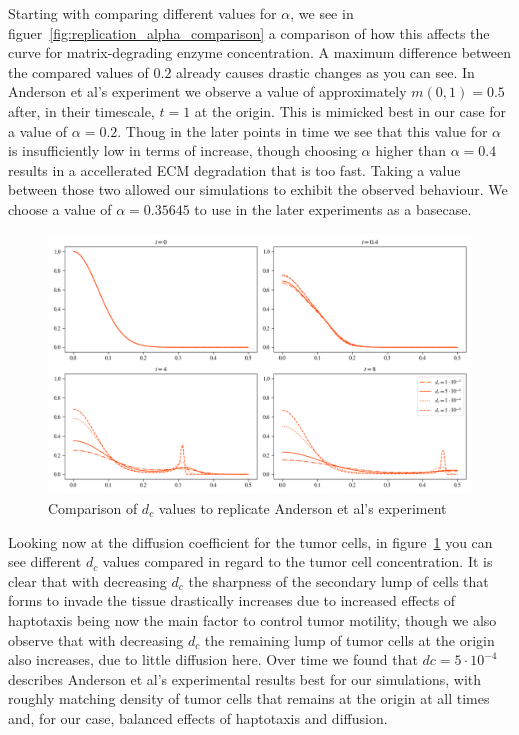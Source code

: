 Starting with comparing different values for $\alpha$, we see in figuer~\ref{fig:replication_alpha_comparison} a comparison of how this affects the curve for matrix-degrading enzyme concentration. A maximum difference between the compared values of $0.2$ already causes drastic changes as you can see. In Anderson et al's experiment we observe a value of approximately $m(0,1)=0.5$ after, in their timescale, $t=1$ at the origin. This is mimicked best in our case for a value of $\alpha=0.2$. Thoug in the later points in time we see that this value for $\alpha$ is insufficiently low in terms of increase, though choosing $\alpha$ higher than $\alpha=0.4$ results in a accellerated ECM degradation that is too fast. Taking a value between those two allowed our simulations to exhibit the observed behaviour. We choose a value of $\alpha=0.35645$ to use in the later experiments as a basecase.\newline
\begin{figure}[!htb]
    \centering
    \includegraphics[width=\textwidth]{resources/images/dc_comparison.png}
    \caption{Comparison of $d_c$ values to replicate Anderson et al's experiment}
    \label{fig:replication_dc_comparison}
\end{figure}
Looking now at the diffusion coefficient for the tumor cells, in figure~\ref{fig:replication_dc_comparison} you can see different $d_c$ values compared in regard to the tumor cell concentration. It is clear that with decreasing $d_c$ the sharpness of the secondary lump of cells that forms to invade the tissue drastically increases due to increased effects of haptotaxis being now the main factor to control tumor motility, though we also observe that with decreasing $d_c$ the remaining lump of tumor cells at the origin also increases, due to little diffusion here. Over time we found that $dc=5 \cdot 10^{-4}$ describes Anderson et al's experimental results best for our simulations, with roughly matching density of tumor cells that remains at the origin at all times and, for our case, balanced effects of haptotaxis and diffusion.\newline
